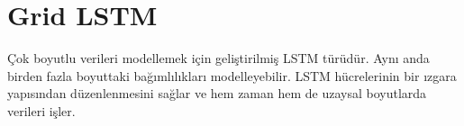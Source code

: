 \section{Grid LSTM}
Çok boyutlu verileri modellemek için geliştirilmiş LSTM türüdür. Aynı anda birden fazla boyuttaki bağımlılıkları modelleyebilir. LSTM hücrelerinin bir ızgara yapısından düzenlenmesini sağlar ve hem zaman hem de uzaysal boyutlarda verileri işler.

\newpage